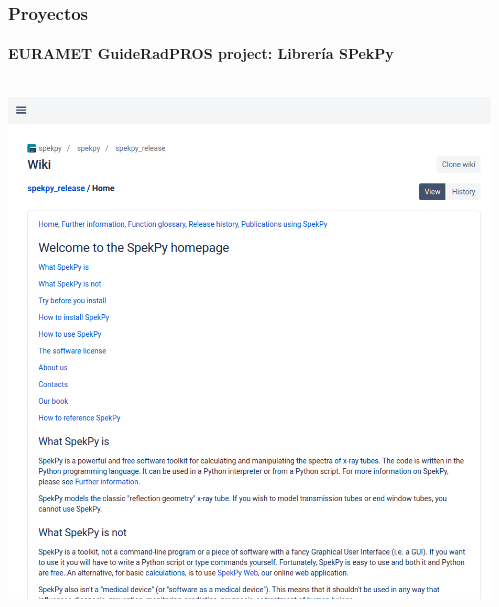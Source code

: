 \documentclass{beamer}
\begin{document}
	\begin{frame}
		\frametitle{Proyectos}
		\framesubtitle{EURAMET GuideRadPROS project: Librería SPekPy}
		\centering
		\begin{columns}[T]
			\begin{column}{0.55\textwidth}
				\includegraphics[width=\textwidth]{GRP_spekpy_bitbucket}
			\end{column}
			\begin{column}{0.4\textwidth}

\end{column}
\end{columns}
\end{frame}
\end{document}
